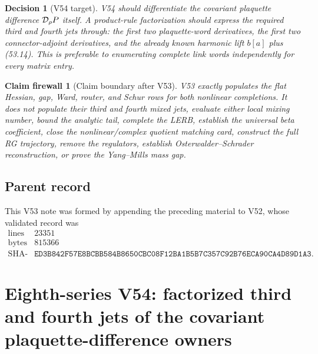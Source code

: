 \documentclass[11pt,oneside]{book}
\newtheorem{firewall}[theorem]{Claim firewall}
\newtheorem{decision}[theorem]{Decision}
\theoremstyle{definition}
\theoremstyle{remark}
\begin{document}
\begin{decision}[V54 target]
\label{dec:e8v53-next}
V54 should differentiate the covariant plaquette difference
\({\cal D}_\rho P\) itself.  A product-rule factorization should
express the required third and fourth jets through: the first two
plaquette-word derivatives, the first two connector-adjoint
derivatives, and the already known harmonic lift \(b[a]\) plus
(53.14).  This is preferable to enumerating complete link words
independently for every matrix entry.
\end{decision}

\begin{firewall}[Claim boundary after V53]
\label{fire:e8v53-claim}
V53 exactly populates the flat Hessian, gap, Ward, router, and
Schur rows for both nonlinear completions.  It does not populate
their third and fourth mixed jets, evaluate either local mixing
number, bound the analytic tail, complete the LERB, establish the
universal beta coefficient, close the nonlinear/complex quotient
matching card, construct the full RG trajectory, remove the
regulators, establish Osterwalder--Schrader reconstruction, or
prove the Yang--Mills mass gap.
\end{firewall}

\subsection{Parent record}

This V53 note was formed by appending the preceding material to V52,
whose validated record was
\[
\begin{array}{c|c}
\text{lines}&23351\\
\text{bytes}&815366\\
\text{SHA-256}&
\texttt{ED3B842F57E8BCBB584B8650CBC08F12BA1B5B7C357C92B76ECA90CA4D89D1A3}.
\end{array}
\]



\section{Eighth-series V54: factorized third and fourth jets of the
covariant plaquette-difference owners}
\label{sec:e8v54}
\end{document}
